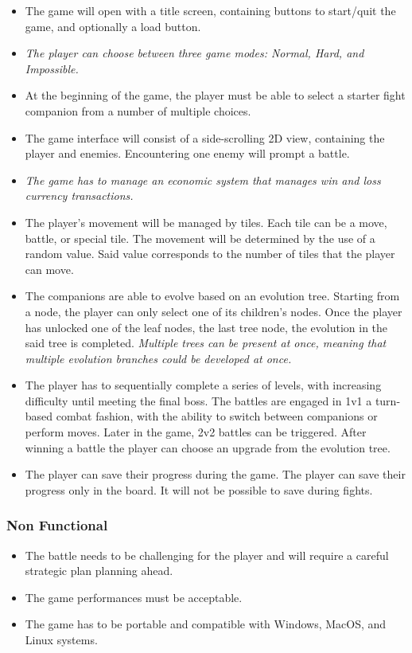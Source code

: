 \documentclass[12pt, a4paper]{report}
\begin{document}
\begin{itemize}
    \item The game will open with a title screen, containing buttons to start/quit the game, and optionally a load button.
    \item \textit{The player can choose between three game modes: Normal, Hard, and Impossible.}
    \item At the beginning of the game, the player must be able to select a starter fight companion from a number of multiple choices.
    \item The game interface will consist of a side-scrolling 2D view, containing the player and enemies. Encountering one enemy will prompt a battle.
    \item \textit{The game has to manage an economic system that manages win and loss currency transactions.}
    \item The player's movement will be managed by tiles. Each tile can be a move, battle, or special tile.
        The movement will be determined by the use of a random value. Said value corresponds to the number of tiles that the player can move.
    \item The companions are able to evolve based on an evolution tree. Starting from a node, the player can only select one of its children's nodes.
        Once the player has unlocked one of the leaf nodes, the last tree node, the evolution in the said tree is completed.
        \textit{Multiple trees can be present at once, meaning that multiple evolution branches could be developed at once.}
    \item The player has to sequentially complete a series of levels, with increasing difficulty until meeting the final boss.
        The battles are engaged in 1v1 a turn-based combat fashion, with the ability to switch between companions or perform moves.
        Later in the game, 2v2 battles can be triggered. After winning a battle the player can choose an upgrade from the evolution tree.
    \item The player can save their progress during the game. The player can save their progress only in the board.
        It will not be possible to save during fights.
\end{itemize}

\subsubsection{Non Functional}

\begin{itemize}
    \item The battle needs to be challenging for the player and will require a careful strategic plan planning ahead. \label{challengingbattle}
    \item The game performances must be acceptable.
    \item The game has to be portable and compatible with Windows, MacOS, and Linux systems.
\end{itemize}
\end{document}
